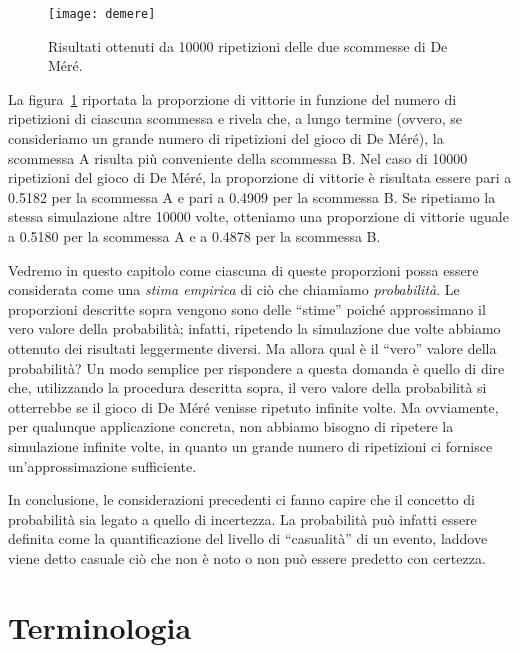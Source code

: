 \begin{figure}%
 \centering
 \texttt{[image: demere]}
 \caption{Risultati ottenuti da \num{10000} ripetizioni delle due scommesse di De Méré.}
 \label{fig:demere}
 \end{figure}
 
La figura~\ref{fig:demere} riportata la proporzione di vittorie in funzione del numero di ripetizioni di ciascuna scommessa e rivela che, a lungo termine (ovvero, se consideriamo un grande numero di ripetizioni del gioco di De Méré), la scommessa A risulta più conveniente della scommessa B. 
Nel caso di \num{10000} ripetizioni del gioco di De Méré, la proporzione di vittorie è risultata essere pari a 0.5182 per la scommessa A e pari a 0.4909 per la scommessa B.
Se ripetiamo la stessa simulazione altre \num{10000} volte, otteniamo una proporzione di vittorie uguale a 0.5180 per la scommessa A e a 0.4878 per la scommessa B.

Vedremo in questo capitolo come ciascuna di queste proporzioni possa essere considerata come una \emph{stima empirica} di ciò che chiamiamo \emph{probabilità}.
Le proporzioni descritte sopra vengono sono delle \enquote{stime} poiché approssimano il vero valore della probabilità; infatti, ripetendo la simulazione due volte abbiamo ottenuto dei risultati leggermente diversi.
Ma allora qual è il \enquote{vero} valore della probabilità?
Un modo semplice per rispondere a questa domanda è quello di dire che, utilizzando la procedura descritta sopra, il vero valore della probabilità si otterrebbe se il gioco di De Méré venisse ripetuto infinite volte.
Ma ovviamente, per qualunque applicazione concreta, non abbiamo bisogno di ripetere la simulazione  infinite volte, in quanto un grande numero di ripetizioni ci fornisce un'approssimazione sufficiente.

In conclusione, le considerazioni precedenti ci fanno capire che il concetto di probabilità sia legato a quello di incertezza. 
La probabilità può infatti essere definita come la quantificazione del livello di \enquote{casualità} di un evento, laddove viene detto casuale ciò che non è noto o non può essere predetto con certezza. 


\section{Terminologia}

